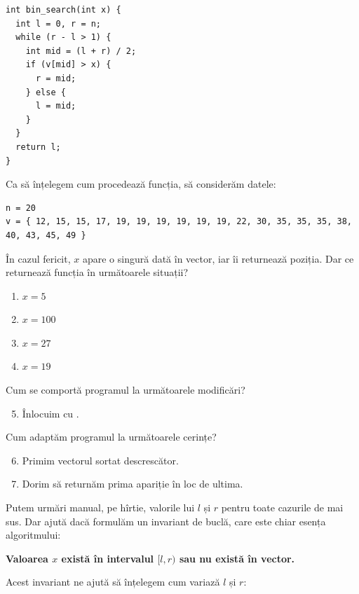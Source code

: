 \documentclass[../main.tex]{subfiles}
\begin{document}
\begin{verbatim}
int bin_search(int x) {
  int l = 0, r = n;
  while (r - l > 1) {
    int mid = (l + r) / 2;
    if (v[mid] > x) {
      r = mid;
    } else {
      l = mid;
    }
  }
  return l;
}
\end{verbatim}

Ca să înțelegem cum procedează funcția, să considerăm datele:

\begin{verbatim}
n = 20
v = { 12, 15, 15, 17, 19, 19, 19, 19, 19, 19, 22, 30, 35, 35, 35, 38, 40, 43, 45, 49 }
\end{verbatim}

În cazul fericit, $x$ apare o singură dată în vector, iar  îi returnează poziția. Dar ce returnează funcția în următoarele situații?

\begin{enumerate}
  \item $x = 5$
  \item $x = 100$
  \item $x = 27$
  \item $x = 19$
\end{enumerate}

Cum se comportă programul la următoarele modificări?

\begin{enumerate}
  \setcounter{enumi}{4}
  \item Înlocuim  cu .
\end{enumerate}

Cum adaptăm programul la următoarele cerințe?

\begin{enumerate}
  \setcounter{enumi}{5}
  \item Primim vectorul sortat descrescător.
  \item Dorim să returnăm prima apariție în loc de ultima.
\end{enumerate}

Putem urmări manual, pe hîrtie, valorile lui $l$ și $r$ pentru toate cazurile de mai sus. Dar ajută dacă formulăm un invariant de buclă, care este chiar esența algoritmului:

\textbf{Valoarea $x$ există în intervalul $[l, r)$ sau nu există în vector.}

Acest invariant ne ajută să înțelegem cum variază $l$ și $r$:
\end{document}

